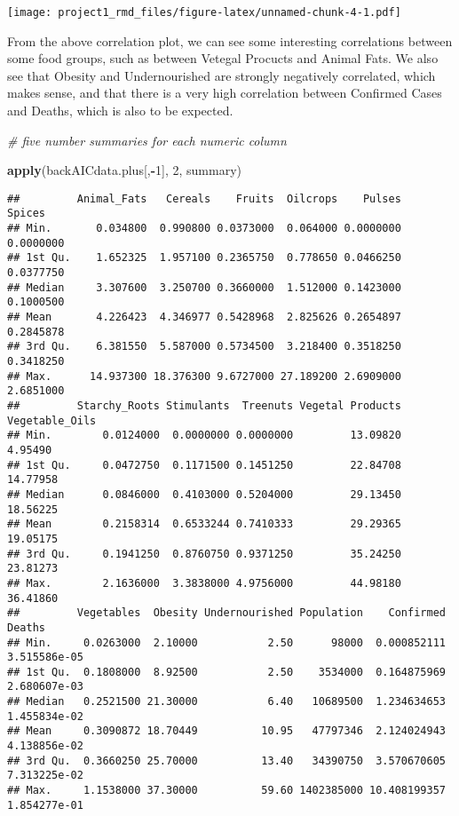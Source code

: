 \documentclass[
]{article}
\newenvironment{Shaded}{\begin{snugshade}}{\end{snugshade}}
\newcommand{\CommentTok}[1]{\textcolor[rgb]{0.56,0.35,0.01}{\textit{#1}}}
\newcommand{\DecValTok}[1]{\textcolor[rgb]{0.00,0.00,0.81}{#1}}
\newcommand{\KeywordTok}[1]{\textcolor[rgb]{0.13,0.29,0.53}{\textbf{#1}}}
\newcommand{\NormalTok}[1]{#1}
\newcommand{\OperatorTok}[1]{\textcolor[rgb]{0.81,0.36,0.00}{\textbf{#1}}}
\begin{document}
\texttt{[image: project1\_rmd\_files/figure-latex/unnamed-chunk-4-1.pdf]}

From the above correlation plot, we can see some interesting
correlations between some food groups, such as between Vetegal Procucts
and Animal Fats. We also see that Obesity and Undernourished are
strongly negatively correlated, which makes sense, and that there is a
very high correlation between Confirmed Cases and Deaths, which is also
to be expected.

\begin{Shaded}
\begin{Highlighting}[]
\CommentTok{# five number summaries for each numeric column}

\KeywordTok{apply}\NormalTok{(backAICdata.plus[,}\OperatorTok{-}\DecValTok{1}\NormalTok{], }\DecValTok{2}\NormalTok{, summary)}
\end{Highlighting}
\end{Shaded}

\begin{verbatim}
##         Animal_Fats   Cereals    Fruits  Oilcrops    Pulses    Spices
## Min.       0.034800  0.990800 0.0373000  0.064000 0.0000000 0.0000000
## 1st Qu.    1.652325  1.957100 0.2365750  0.778650 0.0466250 0.0377750
## Median     3.307600  3.250700 0.3660000  1.512000 0.1423000 0.1000500
## Mean       4.226423  4.346977 0.5428968  2.825626 0.2654897 0.2845878
## 3rd Qu.    6.381550  5.587000 0.5734500  3.218400 0.3518250 0.3418250
## Max.      14.937300 18.376300 9.6727000 27.189200 2.6909000 2.6851000
##         Starchy_Roots Stimulants  Treenuts Vegetal Products Vegetable_Oils
## Min.        0.0124000  0.0000000 0.0000000         13.09820        4.95490
## 1st Qu.     0.0472750  0.1171500 0.1451250         22.84708       14.77958
## Median      0.0846000  0.4103000 0.5204000         29.13450       18.56225
## Mean        0.2158314  0.6533244 0.7410333         29.29365       19.05175
## 3rd Qu.     0.1941250  0.8760750 0.9371250         35.24250       23.81273
## Max.        2.1636000  3.3838000 4.9756000         44.98180       36.41860
##         Vegetables  Obesity Undernourished Population    Confirmed       Deaths
## Min.     0.0263000  2.10000           2.50      98000  0.000852111 3.515586e-05
## 1st Qu.  0.1808000  8.92500           2.50    3534000  0.164875969 2.680607e-03
## Median   0.2521500 21.30000           6.40   10689500  1.234634653 1.455834e-02
## Mean     0.3090872 18.70449          10.95   47797346  2.124024943 4.138856e-02
## 3rd Qu.  0.3660250 25.70000          13.40   34390750  3.570670605 7.313225e-02
## Max.     1.1538000 37.30000          59.60 1402385000 10.408199357 1.854277e-01
\end{verbatim}
\end{document}
